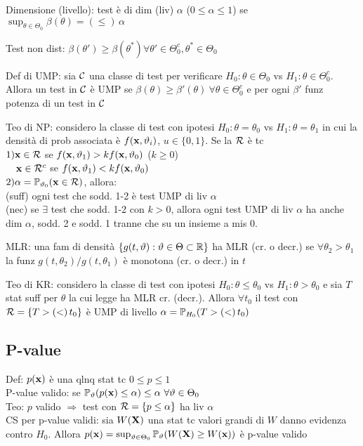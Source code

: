 \smallskip

Dimensione (livello): test è di dim (liv) $\alpha$ ($0\leq\alpha\leq1$) se $\sup_{\theta\in\Theta_0}\beta(\theta)=(\leq)\,\alpha$

\smallskip

Test non dist: $\beta(\theta')\geq\beta(\theta^*)\forall \theta'\in\Theta_0^c,\theta^*\in\Theta_0$

\smallskip

Def di UMP: sia $\mathcal{C}$ una classe di test per verificare $H_0:\theta\in\Theta_0$ vs $H_1:\theta\in\Theta_0^c$. Allora un test in $\mathcal{C}$ è UMP se $\beta(\theta)\geq\beta'(\theta)\ \forall\theta\in\Theta_0^c$ e per ogni $\beta'$ funz potenza di un test in $\mathcal{C}$

\smallskip

Teo di NP: considero la classe di test con ipotesi $H_0:\theta=\theta_0$ vs $H_1:\theta=\theta_1$ in cui la densità di prob associata è $f(\mathbf{x},\vartheta_i)$, $u\in\{0,1\}$. Se la $\mathcal{R}$ è tc \\
$1)\mathbf{x}\in\mathcal{R}$ se $f(\mathbf{x},\vartheta_1)>kf(\mathbf{x},\vartheta_0)$ ($k\geq0$)\\
$\quad\mathbf{x}\in\mathcal{R}^c$ se $f(\mathbf{x},\vartheta_1)<kf(\mathbf{x},\vartheta_0)$ \\
$2)\alpha=\mathbb{P}_{\vartheta_0}(\mathbf{x}\in\mathcal{R})$, allora:\\
(suff) ogni test che sodd. 1-2 è test UMP di liv $\alpha$ \\
(nec) se $\exists$ test che sodd. 1-2 con $k>0$, allora ogni test UMP di liv $\alpha$ ha anche dim $\alpha$, sodd. 2 e sodd. 1 tranne che su un insieme a mis 0.

\smallskip

MLR: una fam di densità $\{g(t,\vartheta):\vartheta\in\Theta\subset\mathbb{R}\}$ ha MLR (cr. o decr.) se $\forall\theta_2>\theta_1$ la funz $g(t,\theta_2)/g(t,\theta_1)$ è monotona (cr. o decr.) in $t$ 

\smallskip

Teo di KR: considero la classe di test con ipotesi $H_0:\theta\leq\theta_0$ vs $H_1:\theta>\theta_0$ e sia $T$ stat suff per $\theta$ la cui legge ha MLR cr. (decr.). Allora $\forall t_0$ il test con $\mathcal{R}=\{T>(<)\,t_0\}$ è UMP di livello $\alpha=\mathbb{P}_{H_0}(T>(<)\,t_0)$

\subsection{P-value}

Def: $p(\mathbf{x})$ è una qlnq stat tc $0\leq p\leq 1$ \\
P-value valido: se $\PP_\theta(p(\xv)\leq\alpha)\leq\alpha\ \forall\theta\in\Theta_0$ \\
Teo: $p$ valido $\Rightarrow$ test con $\mathcal{R}=\{p\leq\alpha\}$ ha liv $\alpha$ \\
CS per p-value validi: sia $W(\mathbf{X})$ una stat tc valori grandi di $W$ danno evidenza contro $H_0$. Allora $p(\mathbf{x})=\sup_{\vartheta\in\Theta_0}\mathbb{P}_\vartheta(W(\mathbf{X})\geq W(\mathbf{x}))$ è p-value valido 

